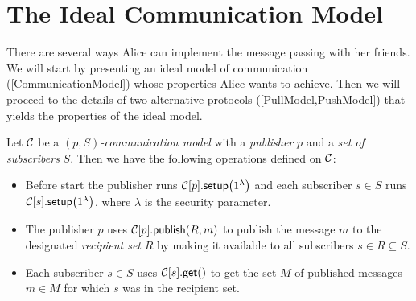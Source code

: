 %
%
\section{The Ideal Communication Model}\label{IdealCommunication}

There are several ways Alice can implement the message passing with her 
friends.
We will start by presenting an ideal model of communication 
(\cref{CommunicationModel}) whose properties Alice wants to achieve.
Then we will proceed to the details of two alternative protocols 
(\cref{PullModel,PushModel}) that yields the properties of the ideal model.

\begin{definition}\label{CommunicationModel}
  Let \(\operatorname{\mathcal{C}}\) be a \emph{\((p, S)\)-communication model} with 
  a \emph{publisher} \(p\) and a \emph{set of subscribers} \(S\).
  Then we have the following operations defined on \(\operatorname{\mathcal{C}}\):
  \begin{itemize}
    \item Before start the publisher runs \(\csetup{p}[1^\lambda]\) and each 
      subscriber \(s\in S\) runs \(\csetup{s}[1^\lambda]\), where \(\lambda\) 
      is the security parameter.
    \item The publisher \(p\) uses \(\cpub{p}[R][m]\) to publish the message 
      \(m\) to the designated \emph{recipient set} \(R\) by making it available 
      to all subscribers \(s\in R\subseteq S\).
    \item Each subscriber \(s\in S\) uses \(\cget{s}[]\) to get the set \(M\) 
      of published messages \(m\in M\) for which \(s\) was in the recipient 
      set.
  \end{itemize}
\end{definition}

